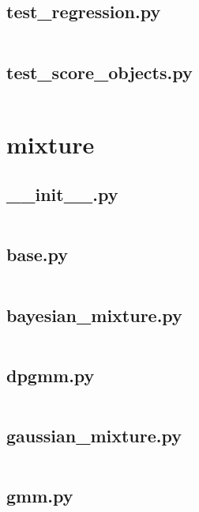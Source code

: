 \documentclass{article}
\begin{document}
\subsection{test\_regression.py}
\inputminted{python}{/home/dufferzafar/dev/@clones/scikit-learn/sklearn/metrics/tests/test_regression.py}
\newpage

\subsection{test\_score\_objects.py}
\inputminted{python}{/home/dufferzafar/dev/@clones/scikit-learn/sklearn/metrics/tests/test_score_objects.py}
\newpage

\section{mixture}

\subsection{\_\_init\_\_.py}
\inputminted{python}{/home/dufferzafar/dev/@clones/scikit-learn/sklearn/mixture/__init__.py}
\newpage

\subsection{base.py}
\inputminted{python}{/home/dufferzafar/dev/@clones/scikit-learn/sklearn/mixture/base.py}
\newpage

\subsection{bayesian\_mixture.py}
\inputminted{python}{/home/dufferzafar/dev/@clones/scikit-learn/sklearn/mixture/bayesian_mixture.py}
\newpage

\subsection{dpgmm.py}
\inputminted{python}{/home/dufferzafar/dev/@clones/scikit-learn/sklearn/mixture/dpgmm.py}
\newpage

\subsection{gaussian\_mixture.py}
\inputminted{python}{/home/dufferzafar/dev/@clones/scikit-learn/sklearn/mixture/gaussian_mixture.py}
\newpage

\subsection{gmm.py}
\inputminted{python}{/home/dufferzafar/dev/@clones/scikit-learn/sklearn/mixture/gmm.py}
\newpage
\end{document}
